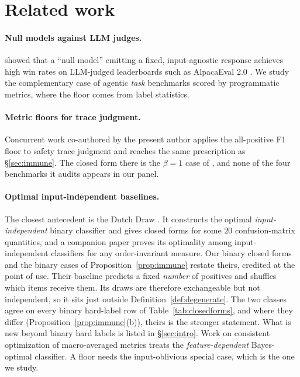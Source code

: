 \documentclass{article}
\theoremstyle{plain}
\theoremstyle{definition}
\begin{document}
\section{Related work}
\label{sec:related}

\paragraph{Null models against LLM judges.}
\citet{zheng2024cheating} showed that a ``null model'' emitting a fixed, input-agnostic response achieves high win rates on LLM-judged leaderboards such as AlpacaEval 2.0 \citep{dubois2024length}. We study the complementary case of agentic \emph{task} benchmarks scored by programmatic metrics, where the floor comes from label statistics.

\paragraph{Metric floors for trace judgment.}
Concurrent work co-authored by the present author \citep{wang2026safety} applies the all-positive F1 floor to safety trace judgment and reaches the same prescription as \S\ref{sec:immune}. The closed form there is the $\beta = 1$ case of \citet{vandebijl2022dutchdraw}, and none of the four benchmarks it audits appears in our panel.

\paragraph{Optimal input-independent baselines.}
The closest antecedent is the Dutch Draw \citep{vandebijl2022dutchdraw,pries2023optimal}. It constructs the optimal \emph{input-independent} binary classifier and gives closed forms for some $20$ confusion-matrix quantities, and a companion paper proves its optimality among input-independent classifiers for any order-invariant measure. Our binary closed forms and the binary cases of Proposition~\ref{prop:immune} restate theirs, credited at the point of use. Their baseline predicts a fixed \emph{number} of positives and shuffles which items receive them. Its draws are therefore exchangeable but not independent, so it sits just outside Definition~\ref{def:degenerate}. The two classes agree on every binary hard-label row of Table~\ref{tab:closedforms}, and where they differ (Proposition~\ref{prop:immune}(b)), theirs is the stronger statement. What is new beyond binary hard labels is listed in \S\ref{sec:intro}. Work on consistent optimization of macro-averaged metrics \citep{schultheis2024macroatk} treats the \emph{feature-dependent} Bayes-optimal classifier. A floor needs the input-oblivious special case, which is the one we study.
\end{document}
